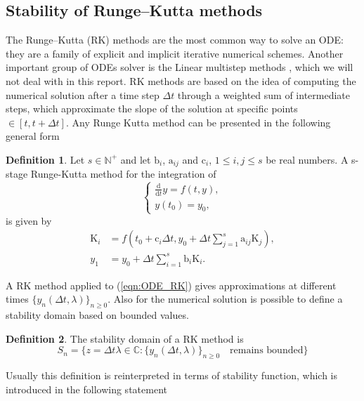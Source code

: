 \documentclass[a4paper,11pt ]{report}
\theoremstyle{definition}
\newtheorem{definition}{Definition}
\begin{document}
\subsection{Stability of Runge--Kutta methods}
The Runge--Kutta (RK) methods are the most common way to solve an ODE: they are a family of explicit and implicit iterative numerical schemes. Another important group of ODEs solver is the Linear multistep methods \cite{Hairer_1}, which we will not deal with in this report. 
RK methods are based on the idea of computing the numerical solution after a time step $\Delta t$ through a weighted sum of intermediate steps, which approximate the slope of the solution at specific points $\in [t,t+\Delta t]$. Any Runge Kutta method can be presented in the following general form
\theoremstyle{definition}
\begin{definition}{}
Let $s\in\mathbb{N}^+$ and let $\text{b}_i$, $\text{a}_{ij}$ and $\text{c}_i$, $1\leq i,j \leq s$ be real numbers. A s-stage Runge-Kutta method for the integration of 
\begin{equation}
\begin{cases}
\frac{\text{d}}{\text{d} t}y=f(t,y),\\ y(t_0)=y_0,
\label{eqn:ODE_RK}
\end{cases}
\end{equation}
is given by 
\begin{align*}
\text{K}_i&=f\left( t_0+\text{c}_i\Delta t, y_0+\Delta t \sum_{j=1}^s\text{a}_{ij}\text{K}_j\right),\\
y_1&=y_0+\Delta t \sum_{i=1}^s\text{b}_i\text{K}_i.
\end{align*}
\label{def:RK_def}
\end{definition}
A RK method applied to (\ref{eqn:ODE_RK}) gives approximations at different times $\{ y_n(\Delta t, \lambda)\}_{n \geq 0}$. Also for the numerical solution is possible to define a stability domain based on bounded values.
\theoremstyle{definition}
\begin{definition}{}
The stability domain of a RK method is
\begin{equation*}
S_n = \{ z=\Delta t \lambda \in \mathbb{C} : \{ y_n(\Delta t, \lambda) \}_{n \geq 0} \quad \text{remains bounded} \}
\end{equation*}
\end{definition}
Usually this definition is reinterpreted in terms of stability function, which is introduced in the following statement
\theoremstyle{definition}
\end{document}
